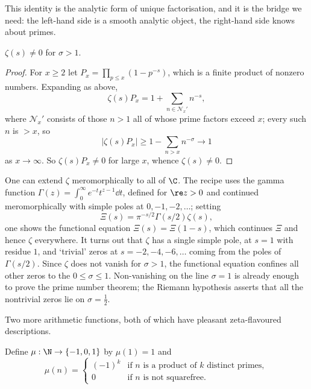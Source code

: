 This identity is the analytic form of unique factorisation, and it is the bridge we need: the left-hand side is a smooth analytic object, the right-hand side knows about primes.

\begin{corollary}
	$\zeta(s) \neq 0$ for $\sigma > 1$.
\end{corollary}
\begin{proof}
	For $x \geq 2$ let $P_x = \prod_{p \leq x}(1 - p^{-s})$, which is a finite product of nonzero numbers. Expanding as above,
	$$
	\zeta(s)P_x = 1 + \sum_{n \in \mathcal N_x'} n^{-s},
	$$
	where $\mathcal N_x'$ consists of those $n > 1$ all of whose prime factors exceed $x$; every such $n$ is $> x$, so
	$$
	|\zeta(s)P_x| \geq 1 - \sum_{n > x}n^{-\sigma} \longrightarrow 1
	$$
	as $x \to \infty$. So $\zeta(s)P_x \neq 0$ for large $x$, whence $\zeta(s) \neq 0$.
\end{proof}

\begin{remark}
	One can extend $\zeta$ meromorphically to all of $\C$. The recipe uses the gamma function $\Gamma(z) = \int_0^\infty e^{-t}t^{z-1}\dd t$, defined for $\re z > 0$ and continued meromorphically with simple poles at $0, -1, -2, \dots$; setting
	$$
	\Xi(s) = \pi^{-s/2}\Gamma(s/2)\zeta(s),
	$$
	one shows the functional equation $\Xi(s) = \Xi(1 - s)$, which continues $\Xi$ and hence $\zeta$ everywhere. It turns out that $\zeta$ has a single simple pole, at $s = 1$ with residue $1$, and `trivial' zeros at $s = -2, -4, -6, \dots$ coming from the poles of $\Gamma(s/2)$. Since $\zeta$ does not vanish for $\sigma > 1$, the functional equation confines all other zeros to the  $0 \leq \sigma \leq 1$. Non-vanishing on the line $\sigma = 1$ is already enough to prove the prime number theorem; the Riemann hypothesis asserts that all the nontrivial zeros lie on $\sigma = \frac12$.
\end{remark}

Two more arithmetic functions, both of which have pleasant zeta-flavoured descriptions.

\begin{definition}
	Define $\mu : \N \to \{-1, 0, 1\}$ by $\mu(1) = 1$ and
	$$
	\mu(n) = \begin{cases} (-1)^k & \text{if } n \text{ is a product of } k \text{ distinct primes}, \\ 0 & \text{if } n \text{ is not squarefree}. \end{cases}
	$$
\end{definition}

